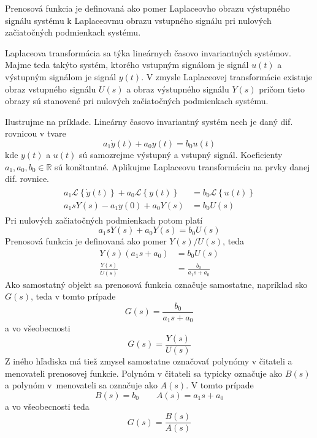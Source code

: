 \documentclass[a4paper, 10pt, ]{article}
\begin{document}
Prenosová funkcia je definovaná ako pomer Laplaceovho obrazu výstupného signálu systému k Laplaceovmu obrazu vstupného signálu pri nulových začiatočných podmienkach systému.

Laplaceova transformácia sa týka lineárnych časovo invariantných systémov. Majme teda takýto systém, ktorého vstupným signálom je signál $u(t)$ a výstupným signálom je signál $y(t)$. V zmysle Laplaceovej transformácie existuje obraz vstupného signálu $U(s)$ a obraz výstupného signálu $Y(s)$ pričom tieto obrazy sú stanovené pri nulových začiatočných podmienkach systému.

Ilustrujme na príklade. Lineárny časovo invariantný systém nech je daný dif. rovnicou v tvare
\begin{equation}
    a_1 \dot y(t) + a_0 y(t) = b_0 u(t)
\end{equation}
kde $y(t)$ a $u(t)$ sú samozrejme výstupný a vstupný signál. Koeficienty $a_1, a_0, b_0 \in \mathbb R$ sú konštantné. Aplikujme Laplaceovu transformáciu na prvky danej dif. rovnice.
\begin{align}
    \begin{aligned}
        a_1 \mathcal{L} \left\{ \dot y(t) \right\} + a_0 \mathcal{L} \left\{ y(t) \right\} &= b_0 \mathcal{L} \left\{ u(t) \right\} \\
        a_1 s Y(s) - a_1 y(0) + a_0 Y(s) &= b_0 U(s)
    \end{aligned}
\end{align}
Pri nulových začiatočných podmienkach potom platí
\begin{equation}
    a_1 s Y(s) + a_0 Y(s) = b_0 U(s)
\end{equation}
Prenosová funkcia je definovaná ako pomer $Y(s)/U(s)$, teda
\begin{subequations}
    \begin{align}
        Y(s) \left( a_1 s + a_0 \right) &= b_0 U(s) \\
        \frac{Y(s)}{U(s)} &= \frac{b_0}{a_1 s + a_0}
    \end{align}
\end{subequations}
Ako samostatný objekt sa prenosová funkcia označuje samostatne, napríklad sko $G(s)$, teda v tomto prípade
\begin{equation} \label{prenosfunkciapriklad}
    G(s) = \frac{b_0}{a_1 s + a_0}  
\end{equation}
a vo všeobecnosti
\begin{equation}
    G(s) = \frac{Y(s)}{U(s)}
\end{equation}
Z iného hľadiska má tiež zmysel samostatne označovať polynómy v čitateli a menovateli prenosovej funkcie. Polynóm v čitateli sa typicky označuje ako $B(s)$ a polynóm v~menovateli sa označuje ako $A(s)$. V tomto prípade 
\begin{equation}
    B(s) = b_0 \qquad A(s) = a_1 s + a_0
\end{equation}
a vo všeobecnosti teda
\begin{equation}
    G(s) = \frac{B(s)}{A(s)}
\end{equation}
\end{document}
